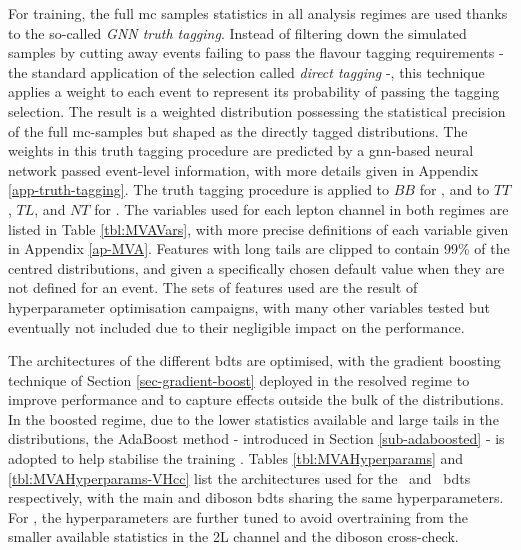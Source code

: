 For training, the full \gls{mc} samples statistics in all analysis regimes are used thanks to the so-called \textit{GNN truth tagging}. Instead of filtering down the simulated samples by cutting away events failing to pass the flavour tagging requirements - the standard application of the selection called \textit{direct tagging} -, this technique applies a weight to each event to represent its probability of passing the tagging selection. The result is a weighted distribution possessing the statistical precision of the full \gls{mc}-samples but shaped as the directly tagged distributions. The weights in this truth tagging procedure are predicted by a \gls{gnn}-based neural network passed event-level information, with more details given in Appendix \ref{app-truth-tagging}. The truth tagging procedure is applied to $BB$ for \vhb, and to $TT$, $TL$, and $NT$ for \vhc. The variables used for each lepton channel in both regimes are listed in Table \ref{tbl:MVAVars}, with more precise definitions of each variable given in Appendix \ref{ap-MVA}. Features with long tails are clipped to contain 99\% of the centred distributions, and given a specifically chosen default value when they are not defined for an event. The sets of features used are the result of hyperparameter optimisation campaigns, with many other variables tested but eventually not included due to their negligible impact on the performance. 



The architectures of the different \gls{bdt}s are optimised, with the gradient boosting technique of Section \ref{sec-gradient-boost} deployed in the resolved regime to improve performance and to capture effects outside the bulk of the distributions. In the boosted regime, due to the lower statistics available and large tails in the distributions, the AdaBoost method - introduced in Section \ref{sub-adaboosted} - is adopted to help stabilise the training \cite{Adaboost}. Tables \ref{tbl:MVAHyperparams} and \ref{tbl:MVAHyperparams-VHcc} list the architectures used for the \vhb\ and \vhc\ \gls{bdt}s respectively, with the main and diboson \gls{bdt}s sharing the same hyperparameters. For \vhc, the hyperparameters are further tuned to avoid overtraining from the smaller available statistics in the 2L channel and the diboson cross-check.




